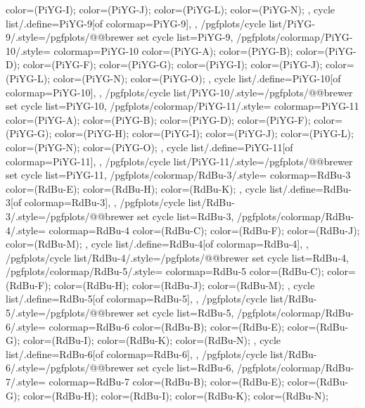 {{{      color=(PiYG-I);
      color=(PiYG-J);
      color=(PiYG-L);
      color=(PiYG-N);
    },
    cycle list/.define={PiYG-9}{[of colormap=PiYG-9]},
  },
  /pgfplots/cycle list/PiYG-9/.style={/pgfplots/@@brewer set cycle list={PiYG-9}},
  /pgfplots/colormap/PiYG-10/.style={
    colormap={PiYG-10}{
      color=(PiYG-A);
      color=(PiYG-B);
      color=(PiYG-D);
      color=(PiYG-F);
      color=(PiYG-G);
      color=(PiYG-I);
      color=(PiYG-J);
      color=(PiYG-L);
      color=(PiYG-N);
      color=(PiYG-O);
    },
    cycle list/.define={PiYG-10}{[of colormap=PiYG-10]},
  },
  /pgfplots/cycle list/PiYG-10/.style={/pgfplots/@@brewer set cycle list={PiYG-10}},
  /pgfplots/colormap/PiYG-11/.style={
    colormap={PiYG-11}{
      color=(PiYG-A);
      color=(PiYG-B);
      color=(PiYG-D);
      color=(PiYG-F);
      color=(PiYG-G);
      color=(PiYG-H);
      color=(PiYG-I);
      color=(PiYG-J);
      color=(PiYG-L);
      color=(PiYG-N);
      color=(PiYG-O);
    },
    cycle list/.define={PiYG-11}{[of colormap=PiYG-11]},
  },
  /pgfplots/cycle list/PiYG-11/.style={/pgfplots/@@brewer set cycle list={PiYG-11}},
  /pgfplots/colormap/RdBu-3/.style={
    colormap={RdBu-3}{
      color=(RdBu-E);
      color=(RdBu-H);
      color=(RdBu-K);
    },
    cycle list/.define={RdBu-3}{[of colormap=RdBu-3]},
  },
  /pgfplots/cycle list/RdBu-3/.style={/pgfplots/@@brewer set cycle list={RdBu-3}},
  /pgfplots/colormap/RdBu-4/.style={
    colormap={RdBu-4}{
      color=(RdBu-C);
      color=(RdBu-F);
      color=(RdBu-J);
      color=(RdBu-M);
    },
    cycle list/.define={RdBu-4}{[of colormap=RdBu-4]},
  },
  /pgfplots/cycle list/RdBu-4/.style={/pgfplots/@@brewer set cycle list={RdBu-4}},
  /pgfplots/colormap/RdBu-5/.style={
    colormap={RdBu-5}{
      color=(RdBu-C);
      color=(RdBu-F);
      color=(RdBu-H);
      color=(RdBu-J);
      color=(RdBu-M);
    },
    cycle list/.define={RdBu-5}{[of colormap=RdBu-5]},
  },
  /pgfplots/cycle list/RdBu-5/.style={/pgfplots/@@brewer set cycle list={RdBu-5}},
  /pgfplots/colormap/RdBu-6/.style={
    colormap={RdBu-6}{
      color=(RdBu-B);
      color=(RdBu-E);
      color=(RdBu-G);
      color=(RdBu-I);
      color=(RdBu-K);
      color=(RdBu-N);
    },
    cycle list/.define={RdBu-6}{[of colormap=RdBu-6]},
  },
  /pgfplots/cycle list/RdBu-6/.style={/pgfplots/@@brewer set cycle list={RdBu-6}},
  /pgfplots/colormap/RdBu-7/.style={
    colormap={RdBu-7}{
      color=(RdBu-B);
      color=(RdBu-E);
      color=(RdBu-G);
      color=(RdBu-H);
      color=(RdBu-I);
      color=(RdBu-K);
      color=(RdBu-N);
}}}
